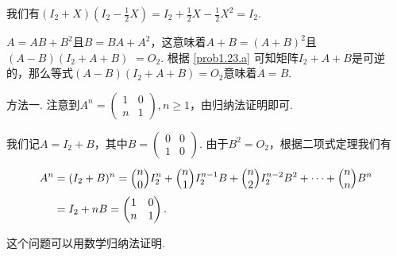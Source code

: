 \setcounter{solution}{22}
\begin{solution}
  \begin{enuma}
    \item 我们有$(I_2+X)(I_2-\frac12X)=I_2+\frac12X-\frac12X^2=I_2$.
    \item $A=AB+B^2$且$B=BA+A^2$，这意味着$A+B=(A+B)^2$且$(A-B)(I_2+A+B)$ $=O_2$. 根据 \ref{prob1.23.a} 可知矩阵$I_2+A+B$是可逆的，那么等式$(A-B)(I_2+A+B)=O_2$意味着$A=B$.
  \end{enuma}
\end{solution}

\setcounter{solution}{24}
\begin{solution}
  {\kaishu 方法一.} 注意到$A^n=\begin{pmatrix}
    1 & 0 \\
    n & 1
  \end{pmatrix},n\ge1$，由归纳法证明即可.

   我们记$A=I_2+B$，其中$B=\begin{pmatrix}
    0 & 0 \\
    1 & 0
  \end{pmatrix}$. 由于$B^2=O_2$，根据二项式定理我们有
  \begin{align*}
    A^n & = (I_2 + B)^n = \Binom n0 I_2^n + \Binom n1 I_2^{n-1}B + \Binom n2 I_2^{n-2}B^2 + \cdots + \Binom nnB^n \\
    & = I_2 + nB = \begin{pmatrix}
      1 & 0 \\
      n & 1
    \end{pmatrix}.
  \end{align*}
\end{solution}

\setcounter{solution}{26}
\begin{solution}
  这个问题可以用数学归纳法证明.
\end{solution}

